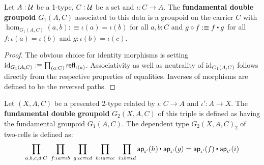 \begin{defn} Let $A : \mathcal{U}$ be a 1-type, $C : \mathcal{U}$ be a set
and $\iota : C \to A$. The \textbf{fundamental double groupoid} $G_1(A,C)$ 
associated to this data is a groupoid on the carrier $C$ with
$\hom_{G_1(A,C)}(a,b) :\equiv \iota(a) = \iota(b)$ for all $a,b:C$ and
$g \circ f :\equiv f \ct g$ for all $f : \iota(a) = \iota(b)$ and $g : \iota(b)
= \iota(c)$.
\end{defn}

\begin{proof}
The obvious choice for identity morphisms is setting $\operatorname{id}_{G_1(A,C)} :\equiv
\prod_{(a:C)} \mathsf{refl}_{\iota(a)}$. Associativity as well as neutrality of $\operatorname{id}_{G_1(A,C)}$
follows directly from the respective properties of equalities. %
Inverses of morphisms are defined to be the reversed paths.
\end{proof}

\begin{defn}
Let $(X,A,C)$ be a presented 2-type related by $\iota : C \to A$ and $\iota' :
A \to X$. The \textbf{fundamental double groupoid} $G_2(X,A,C)$ of this triple
is defined as having the fundamental groupoid $G_1(A,C)$. The dependent type
$G_2(X,A,C)_2$ of two-cells is defined as:
\begin{equation}
\prod_{a,b,c,d:C} ~ \prod_{f : \iota a = \iota b} ~ \prod_{g : \iota c = \iota d}
	~ \prod_{h : \iota a = \iota c} ~ \prod_{i : \iota b = \iota d}
	\apiop(h) \ct \apiop(g) = \apiop(f) \ct \apiop(i)
\end{equation}
\end{defn}

